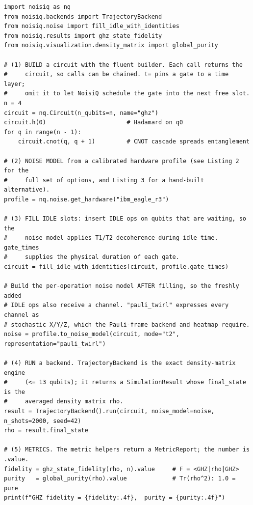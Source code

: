 \documentclass[10pt,twocolumn]{article}
\begin{document}
\begin{lstlisting}[style=noisiqpython, caption={The NoisiQ pipeline. Every
example in the paper is this template with a different circuit builder in
step (1). Here a GHZ circuit is run under a hardware noise profile and its
state fidelity and global purity are reported.}, label={lst:pipeline}]
import noisiq as nq
from noisiq.backends import TrajectoryBackend
from noisiq.noise import fill_idle_with_identities
from noisiq.results import ghz_state_fidelity
from noisiq.visualization.density_matrix import global_purity
 
# (1) BUILD a circuit with the fluent builder. Each call returns the
#     circuit, so calls can be chained. t= pins a gate to a time layer;
#     omit it to let NoisiQ schedule the gate into the next free slot.
n = 4
circuit = nq.Circuit(n_qubits=n, name="ghz")
circuit.h(0)                       # Hadamard on q0
for q in range(n - 1):
    circuit.cnot(q, q + 1)         # CNOT cascade spreads entanglement
 
# (2) NOISE MODEL from a calibrated hardware profile (see Listing 2 for the
#     full set of options, and Listing 3 for a hand-built alternative).
profile = nq.noise.get_hardware("ibm_eagle_r3")
 
# (3) FILL IDLE slots: insert IDLE ops on qubits that are waiting, so the
#     noise model applies T1/T2 decoherence during idle time. gate_times
#     supplies the physical duration of each gate.
circuit = fill_idle_with_identities(circuit, profile.gate_times)
 
# Build the per-operation noise model AFTER filling, so the freshly added
# IDLE ops also receive a channel. "pauli_twirl" expresses every channel as
# stochastic X/Y/Z, which the Pauli-frame backend and heatmap require.
noise = profile.to_noise_model(circuit, mode="t2", representation="pauli_twirl")
 
# (4) RUN a backend. TrajectoryBackend is the exact density-matrix engine
#     (<= 13 qubits); it returns a SimulationResult whose final_state is the
#     averaged density matrix rho.
result = TrajectoryBackend().run(circuit, noise_model=noise, n_shots=2000, seed=42)
rho = result.final_state
 
# (5) METRICS. The metric helpers return a MetricReport; the number is .value.
fidelity = ghz_state_fidelity(rho, n).value     # F = <GHZ|rho|GHZ>
purity   = global_purity(rho).value             # Tr(rho^2): 1.0 = pure
print(f"GHZ fidelity = {fidelity:.4f},  purity = {purity:.4f}")
\end{lstlisting}
 
\end{document}
